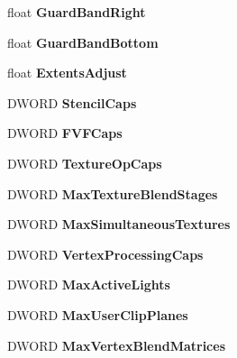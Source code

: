 \begin{DoxyCompactItemize}
float {\bfseries Guard\+Band\+Right}
\item 
\mbox{\label{struct___d3_d_c_a_p_s8_a73d6f1beb9e545b9c9c29e951780c957}} 
float {\bfseries Guard\+Band\+Bottom}
\item 
\mbox{\label{struct___d3_d_c_a_p_s8_aaf5be54a5c9b3ae071acb331f945bb81}} 
float {\bfseries Extents\+Adjust}
\item 
\mbox{\label{struct___d3_d_c_a_p_s8_a701e6b4482de25b5726a154bbcf7c61f}} 
D\+W\+O\+RD {\bfseries Stencil\+Caps}
\item 
\mbox{\label{struct___d3_d_c_a_p_s8_a818b68c36776787bd379095307dfdd29}} 
D\+W\+O\+RD {\bfseries F\+V\+F\+Caps}
\item 
\mbox{\label{struct___d3_d_c_a_p_s8_a3993485289e8116e99d04deea7b6d110}} 
D\+W\+O\+RD {\bfseries Texture\+Op\+Caps}
\item 
\mbox{\label{struct___d3_d_c_a_p_s8_a96984cf5db51d50a80fe36c9e13dbdea}} 
D\+W\+O\+RD {\bfseries Max\+Texture\+Blend\+Stages}
\item 
\mbox{\label{struct___d3_d_c_a_p_s8_a95cd03eaa84742dcd0d1656841fce77a}} 
D\+W\+O\+RD {\bfseries Max\+Simultaneous\+Textures}
\item 
\mbox{\label{struct___d3_d_c_a_p_s8_a80759294aff5d403afd53a09d76c81e8}} 
D\+W\+O\+RD {\bfseries Vertex\+Processing\+Caps}
\item 
\mbox{\label{struct___d3_d_c_a_p_s8_abcc39905bd8b5bed3e263912b6af0dc8}} 
D\+W\+O\+RD {\bfseries Max\+Active\+Lights}
\item 
\mbox{\label{struct___d3_d_c_a_p_s8_aef6b8f32d5c32602d185bb70f1e3b553}} 
D\+W\+O\+RD {\bfseries Max\+User\+Clip\+Planes}
\item 
\mbox{\label{struct___d3_d_c_a_p_s8_aeee5f03e8a35e363bd083b3df7cf683c}} 
D\+W\+O\+RD {\bfseries Max\+Vertex\+Blend\+Matrices}

\end{DoxyCompactItemize}
